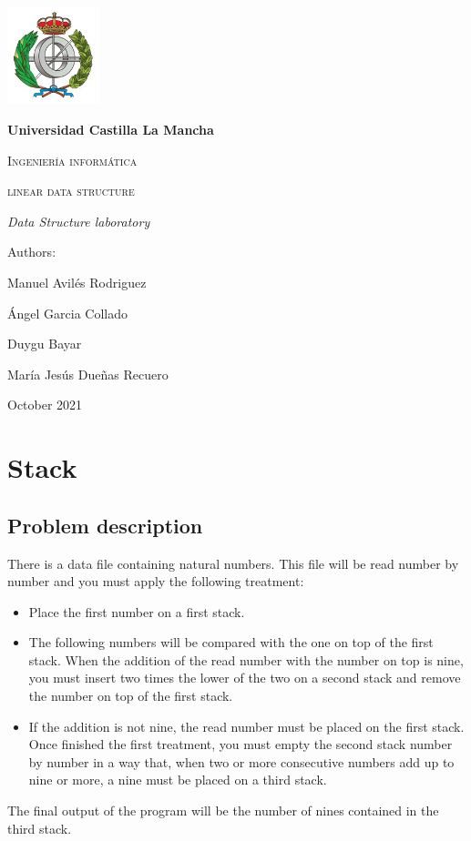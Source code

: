 \documentclass[a4paper]{article}
\theoremstyle{plain}
\theoremstyle{definition}
\begin{document}
    \begin{titlepage}
        \centering
        {\includegraphics[width=0.2\textwidth]{logo}\par}
        \vspace{1cm}
        {\bfseries\LARGE Universidad Castilla La Mancha \par}
        \vspace{1cm}
        {\scshape\Large Ingeniería informática \par}
        \vspace{3cm}
        {\scshape\Huge linear data structure \par}
        \vspace{3cm}
        {\itshape\Large Data Structure laboratory\par}
        \vfill
        {\Large Authors: \par}
        {\Large Manuel Avilés Rodriguez  \par Ángel Garcia Collado\par Duygu Bayar\par María Jesús Dueñas Recuero }
        \vfill
        {\Large October 2021 \par}
    \end{titlepage}
	

\newpage
	\tableofcontents
	\newpage
	\section{Stack}
        \subsection{Problem description}
        There is a data file containing natural numbers. This file will be read number by number and you must apply the following treatment:
        \begin{itemize}
            \item Place the first number on a first stack.
            \item The following numbers will be compared with the one on top of the first stack. When the addition of the read number with the number on top is nine, you must insert two times the lower of the two on a second stack and remove the number on top of the first stack.
            \item If the addition is not nine, the read number must be placed on the first stack. Once finished the first treatment, you must empty the second stack number by number in a way that, when two or more consecutive numbers add up to nine or more, a nine must be placed on a third stack.
        \end{itemize}
        The final output of the program will be the number of nines contained in the third stack.
\end{document}
